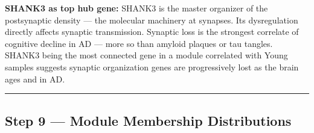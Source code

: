 \documentclass[
]{article}
\newenvironment{Shaded}{\begin{snugshade}}{\end{snugshade}}
\newcommand{\AttributeTok}[1]{\textcolor[rgb]{0.13,0.29,0.53}{#1}}
\newcommand{\DecValTok}[1]{\textcolor[rgb]{0.00,0.00,0.81}{#1}}
\newcommand{\FloatTok}[1]{\textcolor[rgb]{0.00,0.00,0.81}{#1}}
\newcommand{\FunctionTok}[1]{\textcolor[rgb]{0.13,0.29,0.53}{\textbf{#1}}}
\newcommand{\NormalTok}[1]{#1}
\newcommand{\SpecialCharTok}[1]{\textcolor[rgb]{0.81,0.36,0.00}{\textbf{#1}}}
\newcommand{\StringTok}[1]{\textcolor[rgb]{0.31,0.60,0.02}{#1}}
\begin{document}
\textbf{SHANK3 as top hub gene:} SHANK3 is the master organizer of the
postsynaptic density --- the molecular machinery at synapses. Its
dysregulation directly affects synaptic transmission. Synaptic loss is
the strongest correlate of cognitive decline in AD --- more so than
amyloid plaques or tau tangles. SHANK3 being the most connected gene in
a module correlated with Young samples suggests synaptic organization
genes are progressively lost as the brain ages and in AD.

\begin{center}\rule{0.5\linewidth}{0.5pt}\end{center}

\subsection{Step 9 --- Module Membership
Distributions}\label{step-9-module-membership-distributions}

\begin{Shaded}
\end{Shaded}
\end{document}

